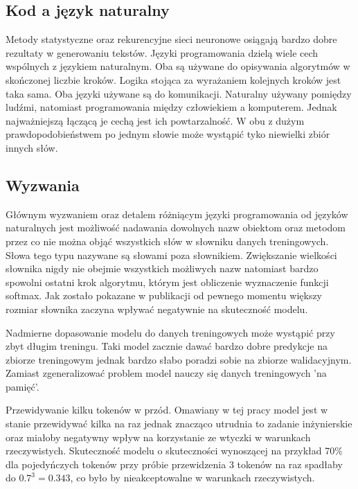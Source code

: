 \subsection {Kod a język naturalny}
\label{similarities}
Metody statystyczne oraz rekurencyjne sieci neuronowe osiągają bardzo dobre rezultaty w generowaniu tekstów. 
Języki programowania dzielą wiele cech wspólnych z językiem naturalnym. Oba są używane do opisywania algorytmów 
w skończonej liczbie kroków. Logika stojąca za wyrażaniem kolejnych kroków jest taka sama. Oba języki używane są 
do komunikacji. Naturalny używany pomiędzy ludźmi, natomiast programowania między człowiekiem a komputerem. 
Jednak najważniejszą łączącą je cechą jest ich powtarzalność. W obu z dużym prawdopodobieństwem po jednym 
słowie może wystąpić tyko niewielki zbiór innych słów. 

\subsection {Wyzwania}
\label{chellenges}
Głównym wyzwaniem oraz detalem różniącym języki programowania od języków naturalnych jest możliwość nadawania dowolnych
nazw obiektom oraz metodom przez co nie można objąć wszystkich słów w słowniku danych treningowych. Słowa tego typu 
nazywane są słowami poza słownikiem. Zwiększanie wielkości słownika nigdy nie obejmie wszystkich możliwych nazw natomiast 
bardzo spowolni ostatni krok algorytmu, którym jest obliczenie wyznaczenie funkcji softmax. Jak zostało pokazane w publikacji 
\cite{hellendoorn} od pewnego momentu większy rozmiar słownika zaczyna wpływać negatywnie na skuteczność modelu. 

Nadmierne dopasowanie modelu do danych treningowych może wystąpić przy zbyt długim treningu. Taki model 
zacznie dawać bardzo dobre predykcje na zbiorze treningowym jednak bardzo słabo poradzi sobie na zbiorze 
walidacyjnym. Zamiast zgeneralizować problem model nauczy się danych treningowych 'na pamięć'. 

Przewidywanie kilku tokenów w przód. Omawiany w tej pracy model jest w stanie przewidywać kilka na raz 
jednak znacząco utrudnia to zadanie inżynierskie oraz miałoby negatywny wpływ na korzystanie ze wtyczki 
w warunkach rzeczywistych. Skuteczność modelu o skuteczności wynoszącej na przykład {70\%} dla pojedyńczych 
tokenów przy próbie przewidzenia 3 tokenów na raz spadłaby do \begin{math}0.7^3 = 0.343\end{math}, co było by nieakceptowalne 
w warunkach rzeczywistych. 


